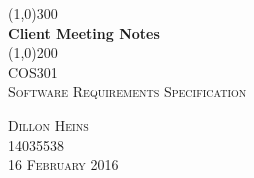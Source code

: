 \documentclass{article}
\begin{document}
\begin{titlepage}
	\begin{center}
		\line(1,0){300}\\
		[6mm]
		\huge{\bfseries Client Meeting Notes}\\
		[2mm]
		\line(1,0){200}\\
		[15mm]
		\textsc{\large COS301}\\
		[7.5mm]
		\textsc{\large Software Requirements Specification}\\
		[10cm]
	\end{center}
	
	\begin{flushright}
		\textsc{\large Dillon Heins\\
		14035538\\
		16 February 2016\\}
	\end{flushright}
\end{titlepage}
\end{document}
